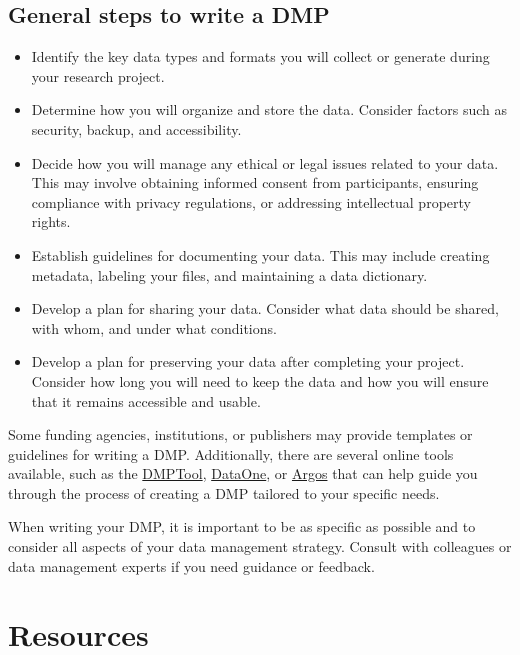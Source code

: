 \documentclass[
  letterpaper,
  DIV=11,
  numbers=noendperiod]{scrreprt}
\begin{document}
\hypertarget{general-steps-to-write-a-dmp}{%
\subsection*{\texorpdfstring{\textbf{General steps to write a
DMP}}{General steps to write a DMP}}\label{general-steps-to-write-a-dmp}}

\begin{itemize}
\item
  Identify the key data types and formats you will collect or generate
  during your research project.
\item
  Determine how you will organize and store the data. Consider factors
  such as security, backup, and accessibility.
\item
  Decide how you will manage any ethical or legal issues related to your
  data. This may involve obtaining informed consent from participants,
  ensuring compliance with privacy regulations, or addressing
  intellectual property rights.
\item
  Establish guidelines for documenting your data. This may include
  creating metadata, labeling your files, and maintaining a data
  dictionary.
\item
  Develop a plan for sharing your data. Consider what data should be
  shared, with whom, and under what conditions.
\item
  Develop a plan for preserving your data after completing your project.
  Consider how long you will need to keep the data and how you will
  ensure that it remains accessible and usable.
\end{itemize}

Some funding agencies, institutions, or publishers may provide templates
or guidelines for writing a DMP. Additionally, there are several online
tools available, such as the \href{https://dmptool.org/}{DMPTool},
\href{https://www.dataone.org/}{DataOne}, or
\href{https://argos.openaire.eu/home}{Argos} that can help guide you
through the process of creating a DMP tailored to your specific needs.

When writing your DMP, it is important to be as specific as possible and
to consider all aspects of your data management strategy. Consult with
colleagues or data management experts if you need guidance or feedback.

\hypertarget{resources-1}{%
\section*{\texorpdfstring{\textbf{Resources}}{Resources}}\label{resources-1}}
\end{document}
